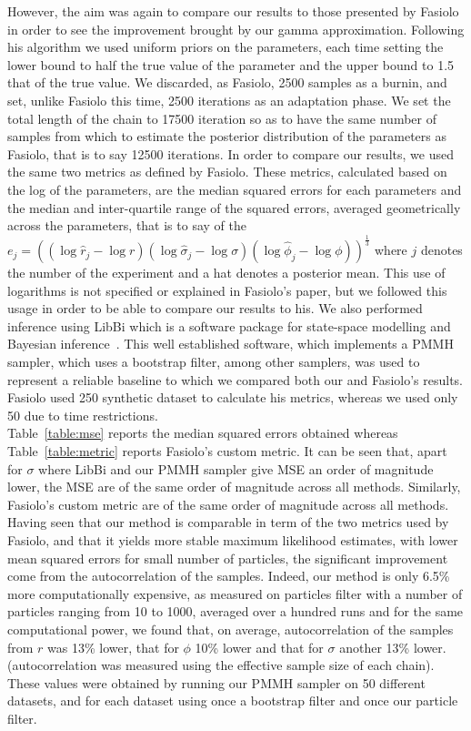 \documentclass[12pt]{article}
\begin{document}
	However, the aim was again to compare our results to those presented by Fasiolo in order to see the improvement brought by our gamma approximation. Following his algorithm we used uniform priors on the parameters, each time setting the lower bound to half the true value of the parameter and the upper bound to 1.5 that of the true value. We discarded, as Fasiolo, 2500 samples as a burnin, and set, unlike Fasiolo this time, 2500 iterations as an adaptation phase. We set the total length of the chain to 17500 iteration so as to have the same number of samples from which to estimate the posterior distribution of the parameters as Fasiolo, that is to say 12500 iterations. In order to compare our results, we used the same two metrics as defined by Fasiolo. These metrics, calculated based on the log of the parameters, are the median squared errors for each parameters and the median and inter-quartile range of the squared errors, averaged geometrically across the parameters, that is to say of the $e_j = ((\log\hat{ r}_j-\log r)(\log\hat{\sigma}_j-\log\sigma)(\log\hat{\phi}_j-\log\phi))^\frac{1}{3}$ where $j$ denotes the number of the experiment and a hat denotes a posterior mean. This use of logarithms is not specified or explained in Fasiolo's paper, but we followed this usage in order to be able to compare our results to his. We also performed inference using LibBi which is a software package for state-space modelling and Bayesian inference~\cite{murray2013bayesian}. This well established software, which implements a PMMH sampler, which uses a bootstrap filter, among other samplers, was used to represent a reliable baseline to which we compared both our and Fasiolo's results. Fasiolo used 250 synthetic dataset to calculate his metrics, whereas we used only 50 due to time restrictions. \\
	Table~\ref{table:mse} reports the median squared errors obtained whereas Table~\ref{table:metric} reports Fasiolo's custom metric. It can be seen that, apart for $\sigma$ where LibBi and our PMMH sampler give MSE an order of magnitude lower, the MSE are of the same order of magnitude across all methods. Similarly, Fasiolo's custom metric are of the same order of magnitude across all methods. \\
	
	Having seen that our method is comparable in term of the two metrics used by Fasiolo, and that it yields more stable maximum likelihood estimates, with lower mean squared errors for small number of particles, the significant improvement come from the autocorrelation of the samples. Indeed, our method is only 6.5\% more computationally expensive, as measured on particles filter with a number of particles ranging from 10 to 1000, averaged over a hundred runs and for the same computational power, we found that, on average, autocorrelation of the samples from $r$ was 13\% lower, that for $\phi$ 10\% lower and that for $\sigma$ another 13\% lower. (autocorrelation was measured using the effective sample size of each chain). These values were obtained by running our PMMH sampler on 50 different datasets, and for each dataset using once a bootstrap filter and once our particle filter.
	
\end{document}
